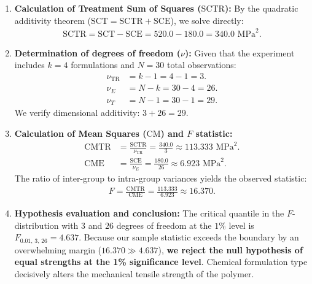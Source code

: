 \begin{solproblema}
	\begin{enumerate}
		\item \textbf{Calculation of Treatment Sum of Squares ($\text{SCTR}$):}
		By the quadratic additivity theorem ($\text{SCT} = \text{SCTR} + \text{SCE}$), we solve directly:
		\begin{align}
			\text{SCTR} = \text{SCT} - \text{SCE} = 520.0 - 180.0 = 340.0 \text{ MPa}^2.
		\end{align}
		
		\item \textbf{Determination of degrees of freedom ($\nu$):}
		Given that the experiment includes $k = 4$ formulations and $N = 30$ total observations:
		\begin{align}
			\nu_{\text{TR}} &= k - 1 = 4 - 1 = 3. \\
			\nu_E &= N - k = 30 - 4 = 26. \\
			\nu_T &= N - 1 = 30 - 1 = 29.
		\end{align}
		We verify dimensional additivity: $3 + 26 = 29$.
		
		\item \textbf{Calculation of Mean Squares ($\text{CM}$) and $F$ statistic:}
		\begin{align}
			\text{CMTR} &= \frac{\text{SCTR}}{\nu_{\text{TR}}} = \frac{340.0}{3} \approx 113.333 \text{ MPa}^2. \\
			\text{CME} &= \frac{\text{SCE}}{\nu_E} = \frac{180.0}{26} \approx 6.923 \text{ MPa}^2.
		\end{align}
		The ratio of inter-group to intra-group variances yields the observed statistic:
		\begin{align}
			F = \frac{\text{CMTR}}{\text{CME}} = \frac{113.333}{6.923} \approx 16.370.
		\end{align}
		
		\item \textbf{Hypothesis evaluation and conclusion:}
		The critical quantile in the $F$-distribution with $3$ and $26$ degrees of freedom at the $1\%$ level is $F_{0.01, \, 3, \, 26} = 4.637$.
		Because our sample statistic exceeds the boundary by an overwhelming margin ($16.370 \gg 4.637$), \textbf{we reject the null hypothesis of equal strengths at the 1\% significance level}. Chemical formulation type decisively alters the mechanical tensile strength of the polymer.
	\end{enumerate}
\end{solproblema}

